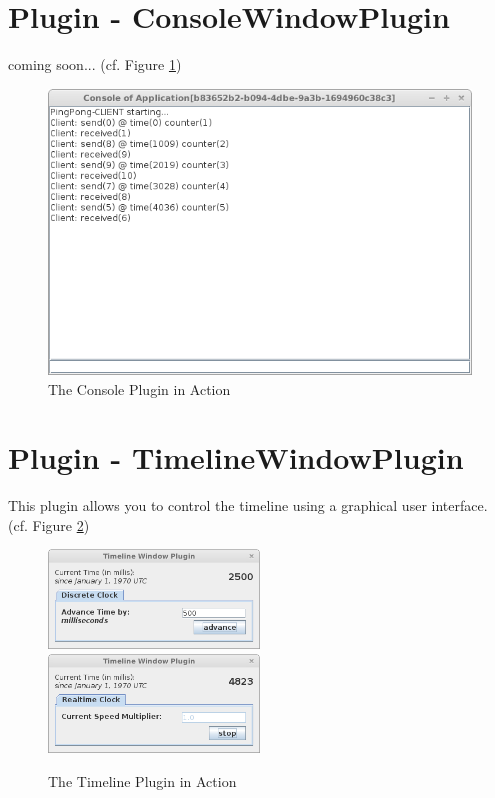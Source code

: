 \documentclass[a4paper,oneside]{book}
\begin{document}
\section{Plugin - ConsoleWindowPlugin}
coming soon... (cf. Figure \ref{ConsolePluginInAction})
\begin{figure}
\begin{center}
\includegraphics[width=\textwidth]{consolePlugin.png}
\caption{The Console Plugin in Action}
\label{ConsolePluginInAction}
\end{center}
\end{figure}

\section{Plugin - TimelineWindowPlugin}
This plugin allows you to control the timeline using a graphical user interface. (cf. Figure \ref{timelinePluginInAction})
\begin{figure}
\includegraphics[width=0.5\textwidth]{timeline-Discrete.png}
\includegraphics[width=0.5\textwidth]{timeline-Realtime.png}
\caption{The Timeline Plugin in Action}
\label{timelinePluginInAction}
\end{figure}
\end{document}
